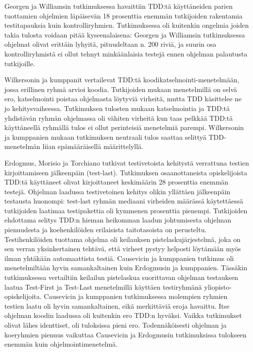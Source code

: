 \documentclass[finnish]{tktltiki2}
\theoremstyle{definition}
\theoremstyle{remark}
\begin{document}
Georgen ja Williamsin \cite{George04} tutkimuksessa havaittiin TDD:tä käyttäneiden parien tuottamien ohjelmien läpäisevän 18 prosenttia enemmän tutkijoiden rakentamia testitapauksia kuin kontrolliryhmien. Tutkimuksessa oli kuitenkin ongelmia joiden takia tulosta voidaan pitää kyseenalaisena: Georgen ja Williamsin tutkimuksessa ohjelmat olivat erittäin lyhyitä, pituudeltaan n. 200 riviä, ja suurin osa kontrolliryhmistä ei ollut tehnyt minkäänlaisia testejä ennen ohjelman palautusta tutkijoille.

Wilkersonin ja kumppanit \cite{Wilkerson12} vertailevat TDD:tä koodikatselmointi-menetelmään, jossa erillinen ryhmä arvioi koodia. Tutkijoiden mukaan menetelmillä on selvä ero, katselmointi poistaa ohjelmasta löytyviä virheitä, mutta TDD käsittelee ne jo kehitysvaiheessa. Tutkimuksen tulosten mukaan katselmointia ja TDD:tä yhdistävän ryhmän ohjelmassa oli vähiten virheitä kun taas pelkkää TDD:tä käyttäneellä ryhmällä tulos ei ollut perinteisiä menetelmiä parempi. Wilkersonin ja kumppanien mukaan tutkimuksen neutraali tulos saattaa selittyä TDD-menetelmän liian epämääräisellä määrittelyllä.

Erdogmus, Morisio ja Torchiano \cite{Erdogmus05} tutkivat testivetoista kehitystä verrattuna testien kirjoittamiseen jälkeenpäin (test-last). Tutkimuksen osaanottaneista opiskelijoista TDD:tä käyttäneet olivat kirjoittaneet keskimäärin 28 prosenttia enemmän testejä. Ohjelman laadussa testivetoinen kehitys olikin yllättäen jälkeenpäin testausta huonompi: test-last ryhmän mediaani virheiden määrässä käytettäessä tutkijoiden laatimaa testipakettia oli kymmenen prosenttia pienempi. Tutkijoiden ehdottama selitys TDD:n hieman heikomman laadun johtumisesta ohjelman pienuudesta ja koehenkilöiden erilaisista taitotasoista on perusteltu. Testihenkilöiden tuottama ohjelma oli keilauksen pistelaskujärjestelmä, joka on sen verran yksinkertainen tehtävä, että virheet pystyy helposti löytämään myös ilman yhtäkään automaattista testiä. Causevicin ja kumppanien \cite{Causevic12} tutkimus oli menetelmiltään hyvin samankaltainen kuin Erdogmusin ja kumppanien. Tässäkin tutkimuksessa vertailtiin keilailun pistelaskua suorittavan ohjelman testauksen laatua Test-First ja Test-Last menetelmillä käyttäen testiryhmänä yliopisto-opiskelijoita. Causevicin ja kumppanien tutkimuksessa molempien ryhmien testien laatu oli hyvin samankaltainen, eikä merkittäviä eroja havaittu. Itse ohjelman koodin laadussa oli kuitenkin ero TDD:n hyväksi. Vaikka tutkimukset olivat lähes identtiset,  oli tuloksissa pieni ero. Todennäköisesti ohjelman ja koeryhmien pienuus vaikuttaa Causevicin ja Erdogmusin tutkimuksissa tulokseen enemmän kuin ohjelmointimenetelmä.
\end{document}
